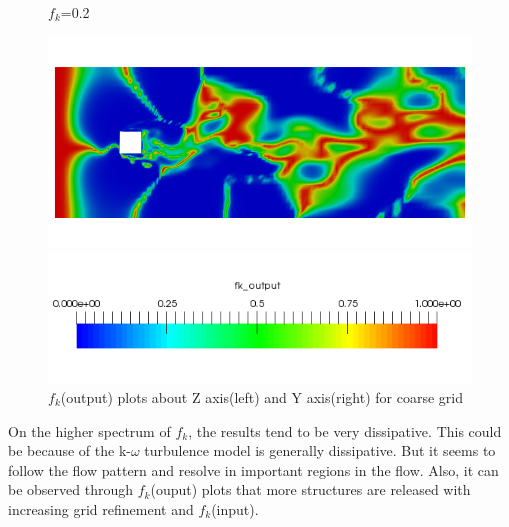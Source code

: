 \begin{figure}[H]
\begin{minipage}[b]{0.5\linewidth}
\caption*{$f_k$=0.2}
\end{minipage}
\begin{minipage}[b]{0.5\linewidth}
\includegraphics[scale=0.25]{figure/coarse/two/fkout_y.png}
\caption*{}
\end{minipage}
\begin{center}
\includegraphics[scale=0.5]{figure/fk_scale.png}
\end{center}
\caption{$f_k$(output) plots about Z axis(left) and Y axis(right) for coarse grid}
\label{fig:46}
\end{figure}
On the higher spectrum of $f_k$, the results tend to be very dissipative. This could be because of the k-$\omega$ turbulence model is generally dissipative. But it seems to follow the flow pattern and resolve in important regions in the flow. Also, it can be observed through $f_k$(ouput) plots that more structures are released with increasing grid refinement and $f_k$(input).




